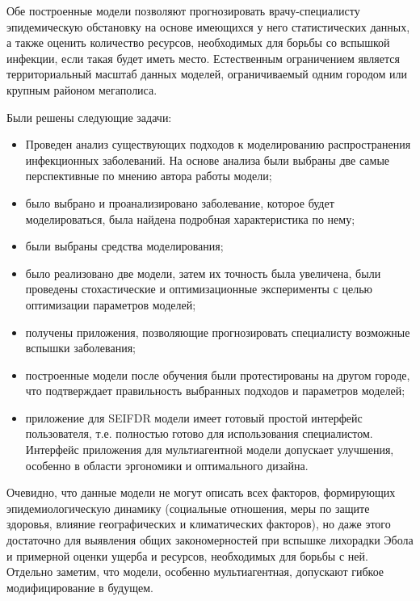 Обе построенные модели позволяют прогнозировать врачу-специалисту эпидемическую обстановку на основе имеющихся у него статистических данных, а также оценить количество ресурсов, необходимых для борьбы со вспышкой инфекции, если такая будет иметь место. Естественным ограничением является территориальный масштаб данных моделей, ограничиваемый одним городом или крупным районом мегаполиса.

Были решены следующие задачи:
\begin{itemize}
	\item Проведен анализ существующих подходов к моделированию распространения инфекционных заболеваний. На основе анализа были выбраны две самые перспективные по мнению автора работы модели;
	\item было выбрано и проанализировано заболевание, которое будет моделироваться, была найдена подробная характеристика по нему;
	\item были выбраны средства моделирования;
	\item было реализовано две модели, затем их точность была увеличена, были проведены стохастические и оптимизационные эксперименты с целью оптимизации параметров моделей;
	\item получены приложения, позволяющие прогнозировать специалисту возможные вспышки заболевания;
	\item построенные модели после обучения были протестированы на другом городе, что подтверждает правильность выбранных подходов и параметров моделей;
	\item приложение для SEIFDR модели имеет готовый простой интерфейс пользователя, т.е. полностью готово для использования специалистом. Интерфейс приложения для мультиагентной модели допускает  улучшения, особенно в области эргономики и оптимального дизайна.
\end{itemize}

Очевидно, что данные модели не могут описать всех факторов, формирующих эпидемиологическую динамику (социальные отношения, меры по защите здоровья, влияние географических и климатических факторов), но даже этого достаточно для выявления общих закономерностей при вспышке лихорадки Эбола и примерной оценки ущерба и ресурсов, необходимых для борьбы с ней. Отдельно заметим, что модели, особенно мультиагентная, допускают гибкое модифицирование в будущем. 